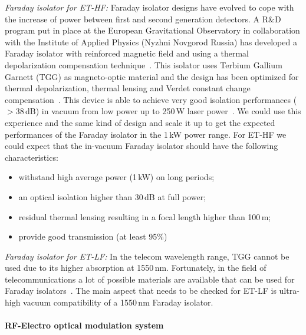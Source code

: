 \emph{Faraday isolator for ET-HF:}
Faraday isolator designs have evolved to cope with the increase of power between first
and second generation detectors. A R\&D program put in place at the European Gravitational
Observatory in collaboration with the Institute of Applied Physics (Nyzhni Novgorod Russia) has
developed a Faraday isolator with reinforced magnetic field and using a thermal depolarization
 compensation technique~\cite{Khazanov_compensation}. This isolator uses Terbium Gallium
 Garnett (TGG) as magneto-optic material and the design has been optimized for thermal
 depolarization, thermal lensing and Verdet constant change compensation~\cite{HPIOfinal}.
 This device is able to achieve very good isolation performances (${}>38$\,dB) in vacuum from
 low power up to 250\,W laser power~\cite{genin}.
We could use this experience and the same kind of design and scale it up to get the expected
performances of the Faraday isolator in the 1\,kW power range.
For ET-HF we could expect that the in-vacuum Faraday isolator should have the following characteristics:
\begin{itemize}
\item withstand high average power (1\,kW) on long periods;
\item an optical isolation higher than 30\,dB at full power;
\item residual thermal lensing resulting in a focal length higher than 100\,m;
\item provide good transmission (at least 95\%)
\end{itemize}

\emph{Faraday isolator for ET-LF:}
In the telecom wavelength range, TGG cannot be used due to its higher absorption at 1550\,nm. Fortunately,
in the field of telecommunications a lot of possible materials are available that can
 be used for Faraday isolators~\cite{mavalvala}. The main aspect that needs to be checked
 for ET-LF is ultra-high vacuum compatibility of a 1550\,nm Faraday isolator.



\paragraph{RF-Electro optical modulation system}
\nopagebreak


